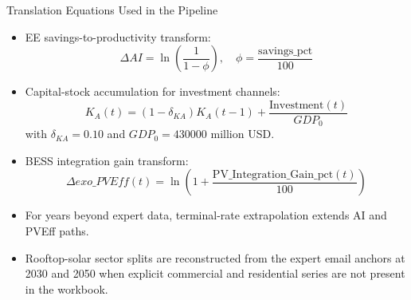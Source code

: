 \documentclass[aspectratio=169]{beamer}
\begin{document}
\begin{frame}{Translation Equations Used in the Pipeline}
\small
\begin{itemize}
  \item EE savings-to-productivity transform:
  \[
  \Delta AI = \ln\left(\frac{1}{1-\phi}\right),\quad \phi=\frac{\text{savings\_pct}}{100}
  \]
  \item Capital-stock accumulation for investment channels:
  \[
  K_A(t)=(1-\delta_{KA})K_A(t-1)+\frac{\text{Investment}(t)}{GDP_0}
  \]
  with $\delta_{KA}=0.10$ and $GDP_0=430000$ million USD.
  \item BESS integration gain transform:
  \[
  \Delta exo\_PVEff(t)=\ln\left(1+\frac{\text{PV\_Integration\_Gain\_pct}(t)}{100}\right)
  \]
  \item For years beyond expert data, terminal-rate extrapolation extends AI and PVEff paths.
  \item Rooftop-solar sector splits are reconstructed from the expert email anchors at 2030 and 2050 when explicit commercial and residential series are not present in the workbook.
\end{itemize}
\end{frame}
\end{document}
